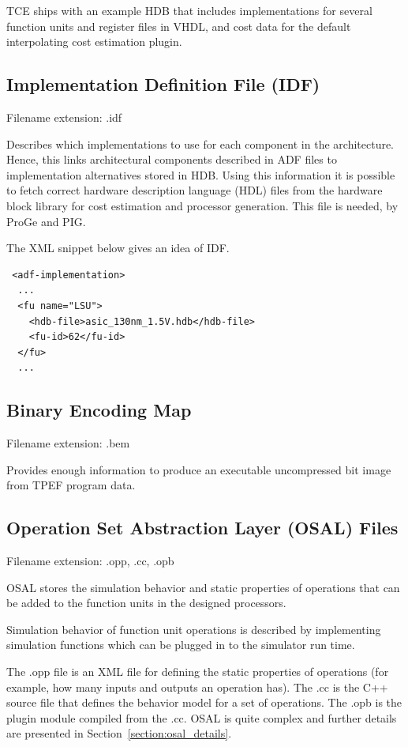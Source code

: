 \documentclass[twoside]{tceusermanual}
\begin{document}
TCE ships with an example HDB that includes implementations for several
function units and register files in VHDL, and cost data for the default
interpolating cost estimation plugin. 

\subsection{Implementation Definition File (IDF)}
\label{sec:idf}

Filename extension:  .idf

Describes which implementations to use for each component in the
architecture. Hence, this links architectural components described in 
ADF files to implementation alternatives stored in HDB. Using this
information it is possible to fetch correct hardware description
language (HDL) files from the hardware block library for cost
estimation and processor generation. This file is needed, by
ProGe and PIG.


The XML snippet below gives an idea of IDF.
\begin{verbatim}
 <adf-implementation>
  ...
  <fu name="LSU">
    <hdb-file>asic_130nm_1.5V.hdb</hdb-file>
    <fu-id>62</fu-id>
  </fu>
  ...
\end{verbatim}



\subsection{Binary Encoding Map}
\label{sec:bem}

Filename extension: .bem 

Provides enough information to produce an executable uncompressed bit
image 
from TPEF program data.


\subsection{Operation Set Abstraction Layer (OSAL) Files}
\label{section:osal}
Filename extension: .opp, .cc, .opb

OSAL stores the simulation behavior and static properties of operations 
that can be added to the function units in the designed processors.

Simulation behavior of function unit operations is described by implementing
simulation functions which can be plugged in to the simulator run time.

The .opp file is an XML file for defining the static properties of
operations (for example, how many inputs and outputs an operation
has). The .cc is the C++ source file that defines the behavior model
for a set of operations. The .opb is the plugin module compiled from
the .cc.  OSAL is quite complex and further details are presented in
Section~\ref{section:osal_details}.
\end{document}
